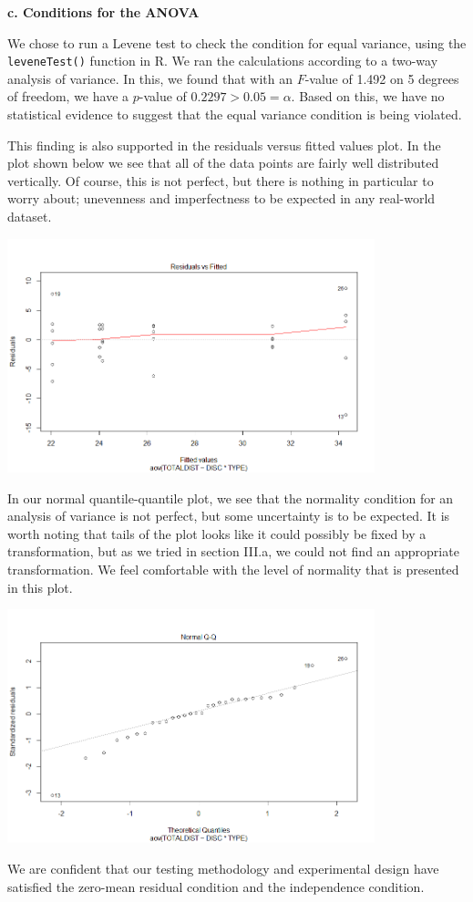 \documentclass[letter,12pt]{article}
\begin{document}
	\begin{center}
		\textbf{c. Conditions for the ANOVA}
	\end{center}
	\justify
	We chose to run a Levene test to check the condition for equal variance, using the \verb!leveneTest()! function in R. We ran the calculations according to a two-way analysis of variance. In this, we found that with an $F$-value of 1.492 on 5 degrees of freedom, we have a $p$-value of $0.2297 > 0.05 = \alpha$. Based on this, we have no statistical evidence to suggest that the equal variance condition is being violated.\par
	This finding is also supported in the residuals versus fitted values plot. In the plot shown below we see that all of the data points are fairly well distributed vertically. Of course, this is not perfect, but there is nothing in particular to worry about; unevenness and imperfectness to be expected in any real-world dataset.\par
	\begin{center}
    \includegraphics[width=0.8\textwidth]{resfitthrow.png}
  \end{center}
  In our normal quantile-quantile plot, we see that the normality condition for an analysis of variance is not perfect, but some uncertainty is to be expected. It is worth noting that tails of the plot looks like it could possibly be fixed by a transformation, but as we tried in section III.a, we could not find an appropriate transformation. We feel comfortable with the level of normality that is presented in this plot.\par
  \begin{center}
    \includegraphics[width=0.8\textwidth]{normalthrow.png}
  \end{center}
  We are confident that our testing methodology and experimental design have satisfied the zero-mean residual condition and the independence condition.\par
	
\end{document}
